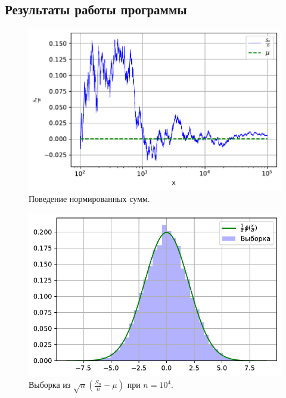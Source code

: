 \documentclass[16pt]{article}
\begin{document}
\subsection{Результаты работы программы}
\begin{figure}[h]
	\center
	\includegraphics[scale=0.7]{5_1.pdf}
	\caption{Поведение нормированных сумм.}
\end{figure}

\begin{figure}[h]
	\center
	\includegraphics[scale=0.7]{5_2.pdf}
	\caption{Выборка из $\sqrt{n}\left(\frac{S_n}{n} - \mu\right)$ при $n = 10^4$.}
\end{figure}
\end{document}

